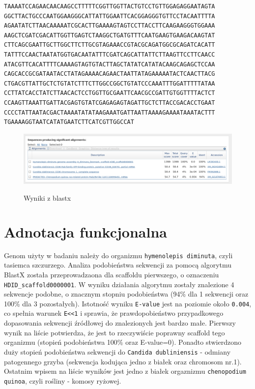 \documentclass[a4paper]{article}
\begin{document}
\begin{verbatim}
TAAAATCCAGAACAACAAGCCTTTTTCGGTTGGTTACTGTCCTGTTGGAGAGGAATAGTA
GGCTTACTGCCCAATGGAAGGGCATTATTGGAATTCACGGAGGGTGTTCCTACAATTTTA
AGAATATCTTAACAAAAATCGCACTTGAAAAGTAGTCCTTACCTTCAAGAAGGGTGGAAA
AAGCTCGATCGACATTGGTTGAGTCTAAGGCTGATGTTTCAATGAAGTGAAGACAAGTAT
CTTCAGCGAATTGCTTGGCTTCTTGCGTAGAAACCGTACGCAGATGGCGCAGATCACATT
TATTTCCAACTAATATGGTGACAATATTTCGATCAGCATTATTCTTAAGTTCCTTCAACC
ATACGTTCACATTTTCAAAAGTAGTGTACTTAGCTATATCATATACAAGCAGAGCTCCAA
CAGCACCGCGATAATACCTATAGAAAACAGAACTAATTATAGAAAAATACTCAACTTACG
CTGACGTTATTGCTCTGTATCTTTCTTGGCCGGCTGTATCCCAAATTTGGATTTTTATAA
CCTTATCACCTATCTTAACACTCCTGGTTGCGAATTCAACGCCGATTGTGGTTTTACTCT
CCAAGTTAAATTGATTACGAGTGTATCGAGAGAGTAGATTGCTCTTACCGACACCTGAAT
CCCCTATTAATACGACTAAAATATATAAGAAATGATTAATTAAAAGAAAATAAATACTTT
TGAAAAGGTAATCATATGAATCTTCATCGTTGGCCAT
\end{verbatim}

\begin{figure}[h]
    \centering
    \includegraphics[width=1.0\textwidth]{result.png}
    \label{fig:single}
    \caption[]{Wyniki z blastx}
\end{figure}

\section{Adnotacja funkcjonalna}
Genom użyty w badaniu należy do organizmu \texttt{hymenolepis diminuta}, czyli tasiemca szczurzego. Analiza podobieństwa sekwencji za pomocą 
algorytmu BlastX została przeprowadzaona dla scaffoldu pierwszego, o oznaczeniu \texttt{HDID\_scaffold0000001}. W wyniku działania algorytmu
zostały znalezione 4 sekwencje podobne, o znacznym stopniu podobieństwa (94\% dla 1 sekwencji oraz 100\% dla 3 pozostałych). Istotność wyniku 
\texttt{E-value} jest na poziomie około \texttt{0.004}, co spełnia warunek \texttt{E<<1} i sprawia, że prawdopobieństwo przypadkowego dopasowania
sekwencji źródłowej do znalezionych jest bardzo małe. Pierwszy wynik na liście potwierdza, że jest to rzeczywiście poprawny scaffold tego organizmu
(stopień podobieństwa 100\% oraz E-value=0). Ponadto stwierdzono duży stopień podobieństwa sekwencji do \texttt{Candida dubliniensis} - odmiany
patogennego grzyba (sekwencja kodująca jedno z białek oraz chromosom nr.1). Ostatnim wpisem na liście wyników jest jedno z białek orgaznizmu
\texttt{chenopodium quinoa}, czyli rośliny - komosy ryżowej. 
\end{document}
